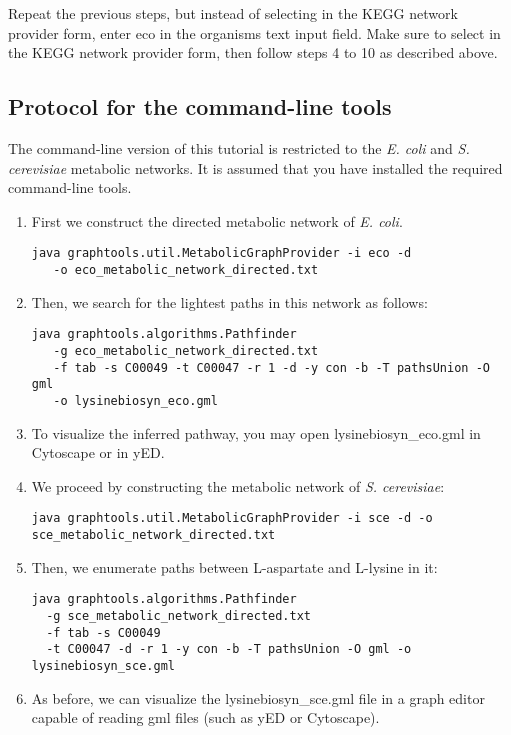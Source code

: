 Repeat the previous steps, but instead of selecting  in the KEGG network provider form, enter eco
in the organisms text input field. Make sure to select  in the KEGG network provider form,
then follow steps 4 to 10 as described above.

\subsection{Protocol for the command-line tools}

The command-line version of this tutorial is restricted to the \textit{E. coli} and \textit{S. cerevisiae}
metabolic networks. It is assumed that you have installed the required command-line tools.

\begin{enumerate}

\item First we construct the directed metabolic network of \textit{E. coli}.

\begin{lstlisting}
java graphtools.util.MetabolicGraphProvider -i eco -d 
   -o eco_metabolic_network_directed.txt
\end{lstlisting}

\item Then, we search for the lightest paths in this network as follows:


\begin{lstlisting}
java graphtools.algorithms.Pathfinder 
   -g eco_metabolic_network_directed.txt 
   -f tab -s C00049 -t C00047 -r 1 -d -y con -b -T pathsUnion -O gml 
   -o lysinebiosyn_eco.gml
\end{lstlisting}


\item To visualize the inferred pathway, you may open lysinebiosyn\_eco.gml in Cytoscape or in yED.


\item We proceed by constructing the metabolic network of \textit{S. cerevisiae}:

\begin{lstlisting}
java graphtools.util.MetabolicGraphProvider -i sce -d -o sce_metabolic_network_directed.txt
\end{lstlisting}

\item Then, we enumerate paths between L-aspartate and L-lysine in it:

\begin{lstlisting}
java graphtools.algorithms.Pathfinder
  -g sce_metabolic_network_directed.txt
  -f tab -s C00049
  -t C00047 -d -r 1 -y con -b -T pathsUnion -O gml -o lysinebiosyn_sce.gml
\end{lstlisting}

\item As before, we can visualize the lysinebiosyn\_sce.gml file in a graph editor capable of reading gml files
     (such as yED or Cytoscape).

\end{enumerate}

